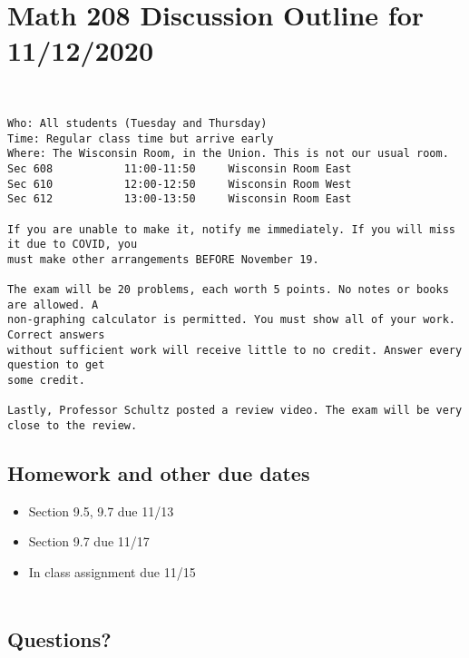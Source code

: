 \documentclass[14pt]{extarticle}
\begin{document}
\section*{Math 208 Discussion Outline for 11/12/2020}

\begin{tcolorbox}[enhanced jigsaw,colback=bg,boxrule=0pt,arc=0pt]
	\\
\footnotesize{
\begin{verbatim}
Who: All students (Tuesday and Thursday)
Time: Regular class time but arrive early
Where: The Wisconsin Room, in the Union. This is not our usual room.
Sec 608           11:00-11:50     Wisconsin Room East
Sec 610           12:00-12:50     Wisconsin Room West
Sec 612           13:00-13:50     Wisconsin Room East

If you are unable to make it, notify me immediately. If you will miss it due to COVID, you 
must make other arrangements BEFORE November 19.

The exam will be 20 problems, each worth 5 points. No notes or books are allowed. A 
non-graphing calculator is permitted. You must show all of your work. Correct answers 
without sufficient work will receive little to no credit. Answer every question to get 
some credit.

Lastly, Professor Schultz posted a review video. The exam will be very close to the review.
\end{verbatim}
}

\end{tcolorbox}


\subsection{Homework and other due dates}
\begin{itemize}

\item Section 9.5, 9.7 due 11/13
\item Section 9.7 due 11/17
\item In class assignment due 11/15 \\\\
\end{itemize}

\subsection{Questions?}
\end{document}
